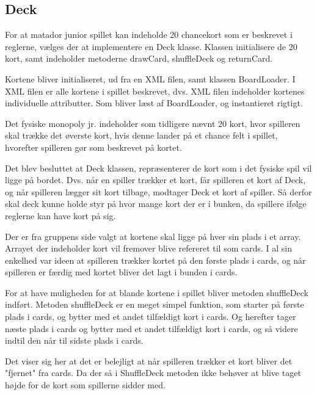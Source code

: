 \documentclass[../../main.tex]{subfiles}
\begin{document}
\begin{flushleft}
\subsection{Deck}
For at matador junior spillet kan indeholde 20 chancekort som er beskrevet i reglerne, vælges der at implementere en Deck klasse. Klassen initialisere de 20 kort, samt indeholder metoderne drawCard, shuffleDeck og returnCard.

Kortene bliver initialiseret, ud fra en XML filen, samt klassen BoardLoader. I XML filen er alle kortene i spillet beskrevet, dvs. XML filen indeholder kortenes individuelle attributter. Som bliver læst af BoardLoader, og instantieret rigtigt.\newline

Det fysiske monopoly jr. indeholder som tidligere nævnt 20 kort, hvor spilleren skal trække det øverste kort, hvis denne lander på et chance felt i spillet, hvorefter spilleren gør som beskrevet på kortet.

Det blev besluttet at Deck klassen, repræsenterer de kort som i det fysiske spil vil ligge på bordet. Dvs. når en spiller trækker et kort, får spilleren et kort af Deck, og når spilleren lægger sit kort tilbage, modtager Deck et kort af spiller. Så derfor skal deck kunne holde styr på hvor mange kort der er i bunken, da spillere ifølge reglerne kan have kort på sig. \newline

Der er fra gruppens side valgt at kortene skal ligge på hver sin plads i et array. Arrayet der indeholder kort vil fremover blive refereret til som cards.
I al sin enkelhed var ideen at spilleren trækker kortet på den første plads i cards, og når spilleren er færdig med kortet bliver det lagt i bunden i cards.\newline

For at have muligheden for at blande kortene i spillet bliver metoden shuffleDeck indført. Metoden shuffleDeck er en meget simpel funktion, som starter på første plads i cards, og bytter med et andet tilfældigt kort i cards. Og herefter tager næste plads i cards og bytter med et andet tilfældigt kort i cards, og så videre indtil den når til sidste plads i cards.

Det viser sig her at det er belejligt at når spilleren trækker et kort bliver det "fjernet" fra cards. Da der så i ShuffleDeck metoden ikke behøver at blive taget højde for de kort som spillerne sidder med. 

\end{flushleft}
\end{document}

